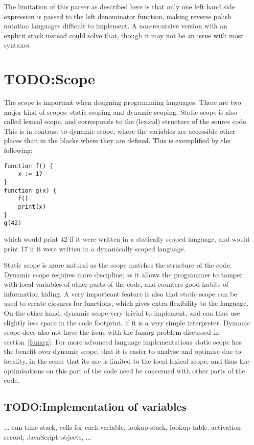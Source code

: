 The limitation of this parser as described here is that only one left hand side expression is passed to the left denominator function, making reverse polish notation languages difficult to implement. A non-recursive version with an explicit stack instead could solve that, though it may not be an issue with most syntaxes. 

\section{TODO:Scope}
The scope is important when designing programming languages.
There are two major kind of scopes: static scoping and dynamic scoping.
Static scope is also called lexical scope, and corresponds to the (lexical) structure of the source code.
This is in contrast to dynamic scope, where the variables are accessible other places than in the blocks where they are defined. This is exemplified by the following:
\begin{verbatim}
function f() {
    x := 17
}
function g(x) {
    f()
    print(x)
}
g(42)
\end{verbatim}
which would print 42 if it were written in a statically scoped language, and would print 17 if it were written in a dynamically scoped language.

Static scope is more natural as the scope matches the structure of the code. Dynamic scope requires more discipline, as it allows the programmer to tamper with local variables of other parts of the code, and counters good habits of information hiding. A very importeant feature is also that static scope can be used to create closures for functions, which gives extra flexibility to the language.
On the other hand, dynamic scope very trivial to implement, and can thus use slightly less space in the code footprint, if it is a very simple interpreter. Dynamic scope does also not have the issue with the funarg problem discussed in section~\ref{funarg}.
For more advanced language implementations static scope has the benefit over dynamic scope, that it is easier to analyse and optimise due to locality, in the sense that its use is limited to the local lexical scope, and thus the optimisations on this part of the code need be concerned with other parts of the code.


\subsection{TODO:Implementation of variables}
... run time stack, cells for each variable, lookup-stack, lookup-table, activation record, JavaScript-objects, ...

